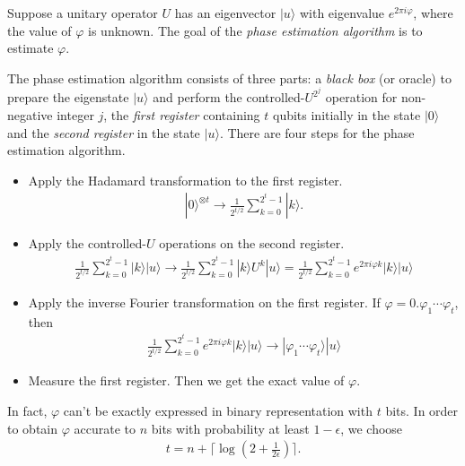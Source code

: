 \documentclass{article}
\newcommand{\ket}[1]{| #1 \rangle}  %
\begin{document}
Suppose a unitary operator $U$ has an eigenvector $\ket{u}$ with eigenvalue $e^{2\pi i\varphi}$, where the value of $\varphi$ is unknown. The goal of the \textit{phase estimation algorithm} is to estimate $\varphi$. 

The phase estimation algorithm consists of three parts: a \textit{black box} (or oracle) to prepare the eigenstate $\ket{u}$ and perform the controlled-$U^{2^j}$ operation for non-negative integer $j$, the \textit{first register} containing $t$ qubits initially in the state $\ket{0}$ and the \textit{second register} in the state $\ket{u}$.
There are four steps for the phase estimation algorithm.
\begin{itemize}
	\item Apply the Hadamard transformation to the first register. 
	\begin{align}
		\ket{0}^{\otimes t} \rightarrow \frac{1}{2^{t/2}}\sum_{k=0}^{2^t-1}\ket{k}.
	\end{align}
	
	\item Apply the controlled-$U$ operations on the second register.
	\begin{align}
		\frac{1}{2^{t/2}}\sum_{k=0}^{2^t-1}\ket{k}\ket{u} \rightarrow \frac{1}{2^{t/2}}\sum_{k=0}^{2^t-1}\ket{k}U^{k}\ket{u}= \frac{1}{2^{t/2}}\sum_{k=0}^{2^t-1}e^{2\pi i \varphi k} \ket{k} \ket{u} 
	\end{align}
	\item Apply the inverse Fourier transformation on the first register. If $\varphi = 0.\varphi_1\cdots \varphi_t$, then
	\begin{align}
		\frac{1}{2^{t/2}}\sum_{k=0}^{2^t-1}e^{2\pi i \varphi k} \ket{k} \ket{u} \rightarrow \ket{\varphi_1\cdots \varphi_t}\ket{u}
	\end{align}
	\item Measure the first register. Then we get the exact value of $\varphi$.
\end{itemize}
In fact, $\varphi$ can't be exactly expressed in binary representation with $t$ bits. In order to obtain $\varphi$ accurate to $n$ bits with probability at least $1-\epsilon$, we choose
\begin{align}
	t = n + \big\lceil \log(2+\frac{1}{2\epsilon}) \big\rceil.
\end{align}
\end{document}
